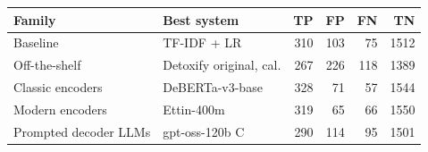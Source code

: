 \begin{tabular}{llrrrr}
\toprule
Family & Best system & TP & FP & FN & TN \\
\midrule
Baseline & TF-IDF + LR & 310 & 103 & 75 & 1512 \\
Off-the-shelf & Detoxify original, cal. & 267 & 226 & 118 & 1389 \\
Classic encoders & DeBERTa-v3-base & 328 & 71 & 57 & 1544 \\
Modern encoders & Ettin-400m & 319 & 65 & 66 & 1550 \\
Prompted decoder LLMs & gpt-oss-120b C & 290 & 114 & 95 & 1501 \\
\bottomrule
\end{tabular}
